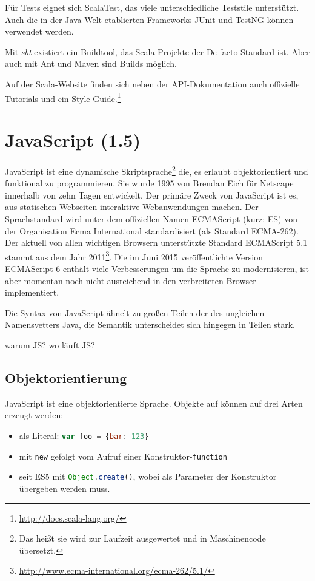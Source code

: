 \documentclass[a4paper, 12pt, hidelinks, listof=totoc, listoftables=totoc, bibliography=totoc]{scrreprt}
\begin{document}
Für Tests eignet sich ScalaTest, das viele unterschiedliche Teststile unterstützt. Auch die in der Java-Welt etablierten Frameworks JUnit und TestNG können verwendet werden.

Mit \textit{sbt} existiert ein Buildtool, das Scala-Projekte der De-facto-Standard ist. Aber auch mit Ant und Maven sind Builds möglich.

Auf der Scala-Website finden sich neben der API-Dokumentation auch offizielle Tutorials und ein Style Guide.\footnote{\url{http://docs.scala-lang.org/}}



\section{JavaScript (1.5)}

JavaScript ist eine dynamische Skriptsprache\footnote{Das heißt sie wird zur Laufzeit ausgewertet und in Maschinencode übersetzt.} die, es erlaubt objektorientiert und funktional zu programmieren. Sie wurde 1995 von Brendan Eich für Netscape innerhalb von zehn Tagen entwickelt\cite{wikipedia.JS}. Der primäre Zweck von JavaScript ist es, aus statischen Webseiten interaktive Webanwendungen machen\cite[S. 361]{flanagan2011.JDG}. Der Sprachstandard wird unter dem offiziellen Namen ECMAScript (kurz: ES) von der Organisation Ecma International standardisiert (als Standard ECMA-262). Der aktuell von allen wichtigen Browsern unterstützte Standard ECMAScript 5.1 stammt aus dem Jahr 2011\footnote{\url{http://www.ecma-international.org/ecma-262/5.1/}}. Die im Juni 2015 veröffentlichte Version ECMAScript 6 enthält viele Verbesserungen um die Sprache zu modernisieren, ist aber momentan noch nicht ausreichend in den verbreiteten Browser implementiert.

Die Syntax von JavaScript ähnelt zu großen Teilen der des ungleichen Namensvetters Java, die Semantik unterscheidet sich hingegen in Teilen stark\cite{eich1996.JSL}.

warum JS?
wo läuft JS?


\subsection{Objektorientierung}

JavaScript ist eine objektorientierte Sprache. Objekte auf können auf drei Arten erzeugt werden:

\begin{itemize}
	\item als Literal: \lstinline[language=JavaScript, style=inline]|var foo = {bar: 123}|
	\item mit \texttt{new} gefolgt vom Aufruf einer Konstruktor-\texttt{function}
	\item seit ES5 mit \lstinline[language=JavaScript, style=inline]|Object.create()|, wobei als Parameter der Konstruktor übergeben werden muss.
\end{itemize}
\end{document}

